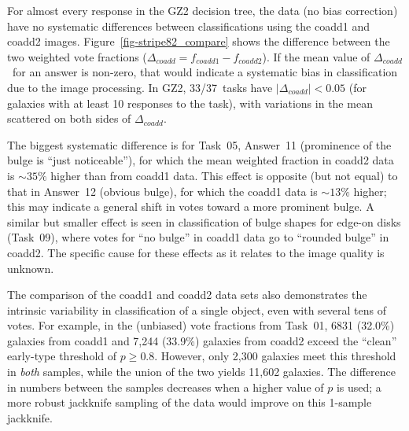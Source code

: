 \documentclass[useAMS,usenatbib]{mn2e}
\newcommand{\dcoadd}{$\Delta_{coadd}$}
\begin{document}

For almost every response in the GZ2 decision tree, the data (no bias correction) have no systematic differences between classifications using the coadd1 and coadd2 images. Figure~\ref{fig-stripe82_compare} shows the difference between the two weighted vote fractions ($\Delta_{coadd} = f_{coadd1} - f_{coadd2}$). If the mean value of \dcoadd~for an answer is non-zero, that would indicate a systematic bias in classification due to the image processing. In GZ2, 33/37~tasks have $|\Delta_{coadd}| < 0.05$ (for galaxies with at least 10 responses to the task), with variations in the mean scattered on both sides of \dcoadd. 

The biggest systematic difference is for Task~05, Answer~11 (prominence of the bulge is ``just noticeable''), for which the mean weighted fraction in coadd2 data is $\sim35\%$ higher than from coadd1 data. This effect is opposite (but not equal) to that in Answer~12 (obvious bulge), for which the coadd1 data is $\sim13\%$ higher; this may indicate a general shift in votes toward a more prominent bulge. A similar but smaller effect is seen in classification of bulge shapes for edge-on disks (Task~09), where votes for ``no bulge'' in coadd1 data go to ``rounded bulge'' in coadd2. The specific cause for these effects as it relates to the image quality is unknown. 

The comparison of the coadd1 and coadd2 data sets also demonstrates the intrinsic variability in classification of a single object, even with several tens of votes. For example, in the (unbiased) vote fractions from Task~01, 6831 (32.0\%) galaxies from coadd1 and 7,244 (33.9\%) galaxies from coadd2 exceed the ``clean'' early-type threshold of $p\geq0.8$. However, only 2,300 galaxies meet this threshold in {\em both} samples, while the union of the two yields 11,602 galaxies. The difference in numbers between the samples decreases when a higher value of $p$ is used; a more robust jackknife sampling of the data would improve on this 1-sample jackknife. 
\end{document}
